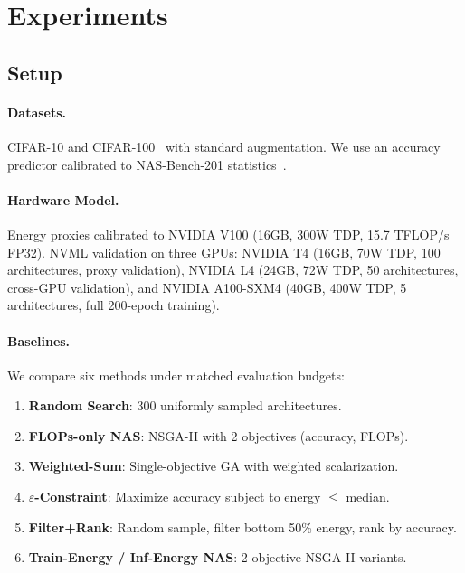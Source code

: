 \documentclass[10pt,twocolumn,letterpaper]{article}
\begin{document}
\section{Experiments}
\label{sec:experiments}

\subsection{Setup}

\paragraph{Datasets.} CIFAR-10 and CIFAR-100~\cite{krizhevsky2009learning} with standard augmentation. We use an accuracy predictor calibrated to NAS-Bench-201 statistics~\cite{dong2020nasbench201}.

\paragraph{Hardware Model.} Energy proxies calibrated to NVIDIA V100 (16GB, 300W TDP, 15.7 TFLOP/s FP32). NVML validation on three GPUs: NVIDIA T4 (16GB, 70W TDP, 100 architectures, proxy validation), NVIDIA L4 (24GB, 72W TDP, 50 architectures, cross-GPU validation), and NVIDIA A100-SXM4 (40GB, 400W TDP, 5 architectures, full 200-epoch training).

\paragraph{Baselines.} We compare six methods under matched evaluation budgets:
\begin{enumerate}[leftmargin=*,nosep]
\item \textbf{Random Search}: 300 uniformly sampled architectures.
\item \textbf{FLOPs-only NAS}: NSGA-II with 2 objectives (accuracy, FLOPs).
\item \textbf{Weighted-Sum}: Single-objective GA with weighted scalarization.
\item \textbf{$\varepsilon$-Constraint}: Maximize accuracy subject to energy $\leq$ median.
\item \textbf{Filter+Rank}: Random sample, filter bottom 50\% energy, rank by accuracy.
\item \textbf{Train-Energy / Inf-Energy NAS}: 2-objective NSGA-II variants.
\end{enumerate}
\end{document}
